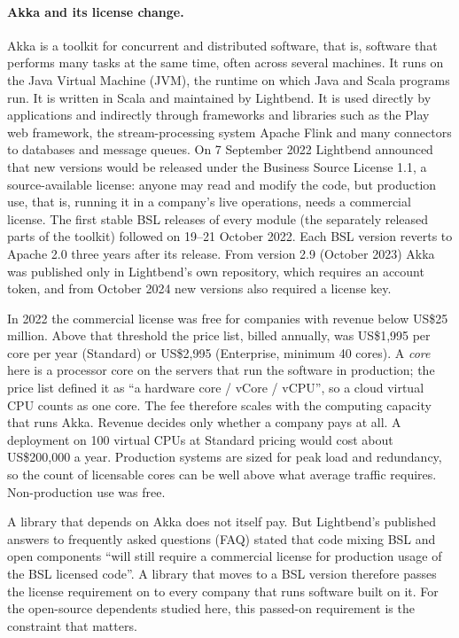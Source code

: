 \documentclass[11pt]{article}
\begin{document}
\paragraph{Akka and its license change.} Akka is a toolkit for concurrent and distributed software, that is, software that performs many tasks at the same time, often across several machines. It runs on the Java Virtual Machine (JVM), the runtime on which Java and Scala programs run. It is written in Scala and maintained by Lightbend. It is used directly by applications and indirectly through frameworks and libraries such as the Play web framework, the stream-processing system Apache Flink and many connectors to databases and message queues. On 7 September 2022 Lightbend announced that new versions would be released under the Business Source License 1.1, a source-available license: anyone may read and modify the code, but production use, that is, running it in a company's live operations, needs a commercial license. The first stable BSL releases of every module (the separately released parts of the toolkit) followed on 19--21 October 2022. Each BSL version reverts to Apache 2.0 three years after its release. From version 2.9 (October 2023) Akka was published only in Lightbend's own repository, which requires an account token, and from October 2024 new versions also required a license key.

In 2022 the commercial license was free for companies with revenue below US\$25 million. Above that threshold the price list, billed annually, was US\$1,995 per core per year (Standard) or US\$2,995 (Enterprise, minimum 40 cores). A \emph{core} here is a processor core on the servers that run the software in production; the price list defined it as ``a hardware core / vCore / vCPU'', so a cloud virtual CPU counts as one core. The fee therefore scales with the computing capacity that runs Akka. Revenue decides only whether a company pays at all. A deployment on 100 virtual CPUs at Standard pricing would cost about US\$200,000 a year. Production systems are sized for peak load and redundancy, so the count of licensable cores can be well above what average traffic requires. Non-production use was free.

A library that depends on Akka does not itself pay. But Lightbend's published answers to frequently asked questions (FAQ) stated that code mixing BSL and open components ``will still require a commercial license for production usage of the BSL licensed code''. A library that moves to a BSL version therefore passes the license requirement on to every company that runs software built on it. For the open-source dependents studied here, this passed-on requirement is the constraint that matters.
\end{document}
